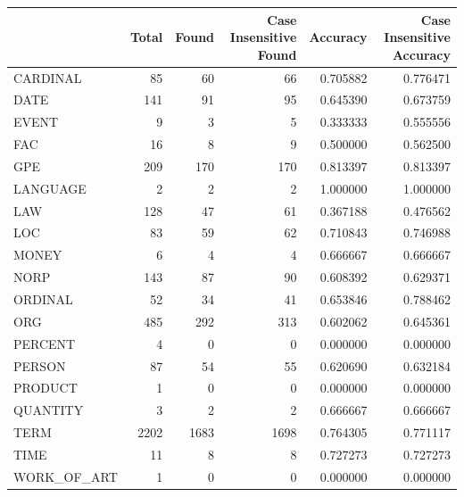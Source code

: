 \begin{tabular}{lrrrrr}
\toprule
 & Total & Found & Case Insensitive Found & Accuracy & Case Insensitive Accuracy \\
\midrule
CARDINAL & 85 & 60 & 66 & 0.705882 & 0.776471 \\
DATE & 141 & 91 & 95 & 0.645390 & 0.673759 \\
EVENT & 9 & 3 & 5 & 0.333333 & 0.555556 \\
FAC & 16 & 8 & 9 & 0.500000 & 0.562500 \\
GPE & 209 & 170 & 170 & 0.813397 & 0.813397 \\
LANGUAGE & 2 & 2 & 2 & 1.000000 & 1.000000 \\
LAW & 128 & 47 & 61 & 0.367188 & 0.476562 \\
LOC & 83 & 59 & 62 & 0.710843 & 0.746988 \\
MONEY & 6 & 4 & 4 & 0.666667 & 0.666667 \\
NORP & 143 & 87 & 90 & 0.608392 & 0.629371 \\
ORDINAL & 52 & 34 & 41 & 0.653846 & 0.788462 \\
ORG & 485 & 292 & 313 & 0.602062 & 0.645361 \\
PERCENT & 4 & 0 & 0 & 0.000000 & 0.000000 \\
PERSON & 87 & 54 & 55 & 0.620690 & 0.632184 \\
PRODUCT & 1 & 0 & 0 & 0.000000 & 0.000000 \\
QUANTITY & 3 & 2 & 2 & 0.666667 & 0.666667 \\
TERM & 2202 & 1683 & 1698 & 0.764305 & 0.771117 \\
TIME & 11 & 8 & 8 & 0.727273 & 0.727273 \\
WORK_OF_ART & 1 & 0 & 0 & 0.000000 & 0.000000 \\
\bottomrule
\end{tabular}
